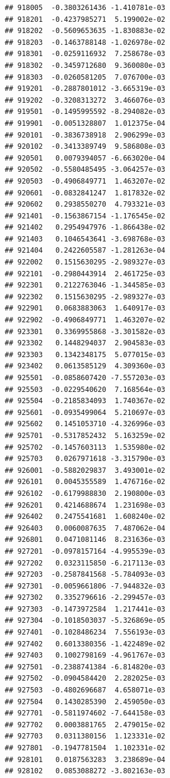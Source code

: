 \documentclass[ignorenonframetext,]{beamer}
\begin{document}
\begin{frame}[fragile]
\begin{verbatim}
## 918005  -0.3803261436 -1.410781e-03
## 918201  -0.4237985271  5.199002e-02
## 918202  -0.5609653635 -1.830883e-02
## 918203  -0.1463788148 -1.026978e-02
## 918301  -0.0259116932  7.258678e-03
## 918302  -0.3459712680  9.360080e-03
## 918303  -0.0260581205  7.076700e-03
## 919201  -0.2887801012 -3.665319e-03
## 919202  -0.3208313272  3.466076e-03
## 919501  -0.1495995592 -8.294082e-03
## 919901  -0.0051328807  1.012375e-04
## 920101  -0.3836738918  2.906299e-03
## 920102  -0.3413389749  9.586808e-03
## 920501   0.0079394057 -6.663020e-04
## 920502  -0.5580485495 -3.064257e-03
## 920503  -0.4906849771  1.463207e-02
## 920601  -0.0832841247  1.817832e-02
## 920602   0.2938550270  4.793321e-03
## 921401  -0.1563867154 -1.176545e-02
## 921402   0.2954947976 -1.866438e-02
## 921403   0.1046543641 -3.698768e-03
## 921404   0.2422605587 -1.281263e-04
## 922002   0.1515630295 -2.989327e-03
## 922101  -0.2980443914  2.461725e-03
## 922301   0.2122763046 -1.344585e-03
## 922302   0.1515630295 -2.989327e-03
## 922901   0.0683883063  1.640917e-03
## 922902  -0.4906849771  1.463207e-02
## 923301   0.3369955868 -3.301582e-03
## 923302   0.1448294037  2.904583e-03
## 923303   0.1342348175  5.077015e-03
## 923402   0.0613585129  4.309360e-03
## 925501  -0.0858607420 -7.557203e-03
## 925503  -0.0229540620  7.168564e-03
## 925504  -0.2185834093  1.740367e-02
## 925601  -0.0935499064  5.210697e-03
## 925602   0.1451053710 -4.326996e-03
## 925701  -0.5317852432  5.163259e-02
## 925702  -0.1457603113  1.535980e-02
## 925703   0.0267971618 -3.315790e-03
## 926001  -0.5882029837  3.493001e-02
## 926101   0.0045355589  1.476716e-02
## 926102  -0.6179988830  2.190800e-03
## 926201   0.4214688674  1.231698e-03
## 926402   0.2475541681  1.608240e-02
## 926403   0.0060087635  7.487062e-04
## 926801   0.0471081146  8.231636e-03
## 927201  -0.0978157164 -4.995539e-03
## 927202   0.0323115850 -6.217113e-03
## 927203  -0.2587841568 -5.784093e-03
## 927301  -0.0059661806 -7.944832e-03
## 927302   0.3352796616 -2.299457e-03
## 927303  -0.1473972584  1.217441e-03
## 927304  -0.1018503037 -5.326869e-05
## 927401  -0.1028486234  7.556193e-03
## 927402   0.6013380356 -1.422489e-02
## 927403   0.1002798169 -4.961767e-03
## 927501  -0.2388741384 -6.814820e-03
## 927502  -0.0904584420  2.282025e-03
## 927503  -0.4802696687  4.658071e-03
## 927504   0.1430285390  2.459050e-03
## 927701  -0.5811974602 -7.644158e-03
## 927702   0.0003881765  2.479015e-02
## 927703   0.0311380156  1.123331e-02
## 927801  -0.1947781504  1.102331e-02
## 928101   0.0187563283  3.238689e-04
## 928102   0.0853088272 -3.802163e-03

\end{verbatim}
\end{frame}
\end{document}
